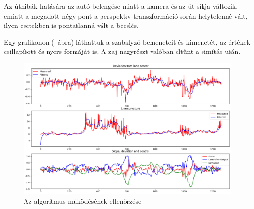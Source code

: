 Az úthibák hatására az autó belengése miatt a kamera és az út síkja változik, emiatt a megadott négy pont a perspektív transzformáció során helytelenné vált, ilyen esetekben is pontatlanná vált a becslés.

Egy grafikonon (~ábra) láthattuk a szabályzó bemeneteit és kimenetét, az értékek csillapított és nyers formáját is. A zaj nagyrészt valóban eltűnt a simítás után.



\begin{figure}[!ht]
	\includegraphics[width=150mm,keepaspectratio]{figures/m09/results.png}
	\caption{Az algoritmus működésének ellenőrzése}
	\label{fig:Results}
\end{figure}







